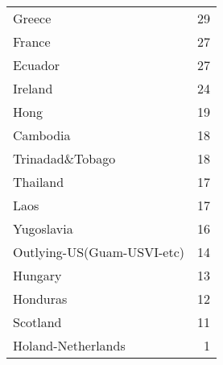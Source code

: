 \begin{table}
\begin{tabular}{lr}
 Greece                     &              29 \\
 France                     &              27 \\
 Ecuador                    &              27 \\
 Ireland                    &              24 \\
 Hong                       &              19 \\
 Cambodia                   &              18 \\
 Trinadad\&Tobago            &              18 \\
 Thailand                   &              17 \\
 Laos                       &              17 \\
 Yugoslavia                 &              16 \\
 Outlying-US(Guam-USVI-etc) &              14 \\
 Hungary                    &              13 \\
 Honduras                   &              12 \\
 Scotland                   &              11 \\
 Holand-Netherlands         &               1 \\
\bottomrule
\end{tabular}
\end{table}
